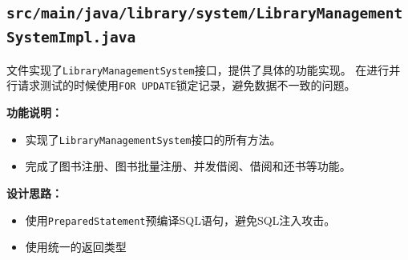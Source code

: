 \documentclass{ctexart}
\begin{document}
\subsection{\texttt{src/main/java/library/system/LibraryManagementSystemImpl.java}}
文件实现了\texttt{LibraryManagementSystem}接口，提供了具体的功能实现。
在进行并行请求测试的时候使用\texttt{FOR UPDATE}锁定记录，避免数据不一致的问题。

\textbf{功能说明：}
\begin{itemize}
    \item 实现了\texttt{LibraryManagementSystem}接口的所有方法。
    \item 完成了图书注册、图书批量注册、并发借阅、借阅和还书等功能。
\end{itemize}

\textbf{设计思路：}
\begin{itemize}
    \item 使用\texttt{PreparedStatement}预编译SQL语句，避免SQL注入攻击。
    \item 使用统一的返回类型
\end{itemize}
\end{document}
